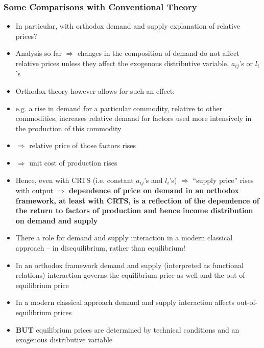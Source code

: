 \documentclass[a4paper,twoside]{article}
\numberwithin{equation}{section}
\numberwithin{figure}{section}
\begin{document}
\subsubsection{Some Comparisons with Conventional Theory}
	\begin{itemize}
		\item In particular, with orthodox demand and supply explanation of relative prices?
		\item Analysis so far \( \Rightarrow \) changes in the composition of demand do not affect relative prices unless they affect the exogenous distributive variable, \( a_{ij} \)'s or \( l_i \)'s
		\item Orthodox theory however allows for such an effect:
		\item e.g. a rise in demand for a particular commodity, relative to other commodities, increases relative demand for factors used more intensively in the production of this commodity
		\item  \( \Rightarrow \) relative price of those factors rises
		\item \( \Rightarrow \) unit cost of production rises
		\item Hence, even with CRTS (i.e. constant \( a_{ij} \)'s and \( l_i \)'s) \( \Rightarrow \) “supply price'' rises with output
		\( \Rightarrow \) \textbf{dependence of price on demand in an orthodox framework, at least with CRTS, is a reflection of the dependence of the return to factors of production and hence income distribution on demand and supply}
		\item There a role for demand and supply interaction in a modern classical approach -- in disequilibrium, rather than equilibrium!
		\item  In an orthodox framework demand and supply (interpreted as functional relations) interaction governs the equilibrium price as well and the out-of-equilibrium price 
		\item In a modern classical approach demand and supply interaction affects out-of-equilibrium prices
		\item \textbf{BUT} equilibrium prices are determined by technical conditions and an exogenous distributive variable
	\end{itemize}
\end{document}
